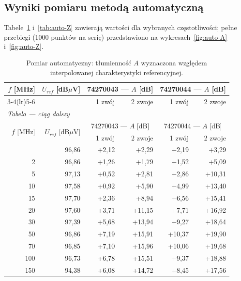 \documentclass[11pt,a4paper]{article}
\begin{document}
\subsection{Wyniki pomiaru metodą automatyczną}

Tabele~\ref{tab:auto-A} i~\ref{tab:auto-Z} zawierają wartości dla wybranych
częstotliwości; pełne przebiegi (1000 punktów na serię) przedstawiono na
wykresach~\ref{fig:auto-A} i~\ref{fig:auto-Z}.

{\small
\begin{longtable}{rrrrrr}
  \caption{Pomiar automatyczny: tłumienność $A$ wyznaczona względem interpolowanej
           charakterystyki referencyjnej.}
  \label{tab:auto-A}\\
  \toprule
    \multirow{2}{*}{$f$ [MHz]} & \multirow{2}{*}{$U_{ref}$ [dB$\mu$V]}
    & \multicolumn{2}{c}{74270043 --- $A$ [dB]} & \multicolumn{2}{c}{74270044 --- $A$ [dB]} \\
    \cmidrule(lr){3-4}\cmidrule(lr){5-6}
     & & 1 zwój & 2 zwoje & 1 zwój & 2 zwoje \\
  \midrule
\endfirsthead
  \multicolumn{6}{l}{\small\textit{Tabela \thetable{} --- ciąg dalszy}}\\
  \toprule
    \multirow{2}{*}{$f$ [MHz]} & \multirow{2}{*}{$U_{ref}$ [dB$\mu$V]}
    & \multicolumn{2}{c}{74270043 --- $A$ [dB]} & \multicolumn{2}{c}{74270044 --- $A$ [dB]} \\
    \cmidrule(lr){3-4}\cmidrule(lr){5-6}
     & & 1 zwój & 2 zwoje & 1 zwój & 2 zwoje \\
  \midrule
\endhead
  \bottomrule
\endfoot
    1 & 96,86 & +2,12 & +2,29 & +2,19 & +3,29 \\
    2 & 96,86 & +1,26 & +1,79 & +1,52 & +5,09 \\
    5 & 97,13 & +0,52 & +2,81 & +2,86 & +10,31 \\
    10 & 97,58 & +0,92 & +5,90 & +4,99 & +13,40 \\
    15 & 97,70 & +2,36 & +8,94 & +6,56 & +15,41 \\
    20 & 97,60 & +3,71 & +11,15 & +7,71 & +16,92 \\
    30 & 97,39 & +5,68 & +13,94 & +9,27 & +18,64 \\
    50 & 96,86 & +7,19 & +15,91 & +10,37 & +19,90 \\
    70 & 96,85 & +7,10 & +15,96 & +10,06 & +19,68 \\
    100 & 96,73 & +6,78 & +15,51 & +9,37 & +18,88 \\
    150 & 94,38 & +6,08 & +14,72 & +8,45 & +17,56 \\

\end{longtable}}
\end{document}
